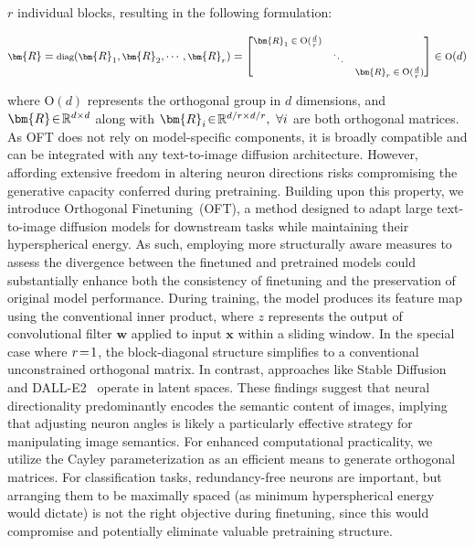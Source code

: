 {$r$ individual blocks, resulting in the following formulation:

\begin{equation}
    \footnotesize
    \bm{R}=\text{diag}(\bm{R}_1,\bm{R}_2,\cdots,\bm{R}_r)=\begin{bmatrix}
    \bm{R}_1\in \text{O}(\frac{d}{r}) &  &\\
    &\ddots & \\
    & & \bm{R}_r\in \text{O}(\frac{d}{r})
    \end{bmatrix}\in \text{O}(d)
\end{equation}

where $\text{O}(d)$ represents the orthogonal group in $d$ dimensions, and $\thickmuskip=2mu \medmuskip=2mu \bm{R} \in \mathbb{R}^{d\times d}$ along with $\thickmuskip=2mu \medmuskip=2mu \bm{R}_i \in \mathbb{R}^{d/r\times d/r},~\forall i$ are both orthogonal matrices. As OFT does not rely on model-specific components, it is broadly compatible and can be integrated with any text-to-image diffusion architecture. However, affording extensive freedom in altering neuron directions risks compromising the generative capacity conferred during pretraining. Building upon this property, we introduce Orthogonal Finetuning~(OFT), a method designed to adapt large text-to-image diffusion models for downstream tasks while maintaining their hyperspherical energy. As such, employing more structurally aware measures to assess the divergence between the finetuned and pretrained models could substantially enhance both the consistency of finetuning and the preservation of original model performance. During training, the model produces its feature map using the conventional inner product, where $z$ represents the output of convolutional filter $\bm{w}$ applied to input $\bm{x}$ within a sliding window. In the special case where $\thickmuskip=2mu \medmuskip=2mu r=1$, the block-diagonal structure simplifies to a conventional unconstrained orthogonal matrix. In contrast, approaches like Stable Diffusion~\cite{rombach2022high} and DALL-E2~\cite{ramesh2022hierarchical} operate in latent spaces. These findings suggest that neural directionality predominantly encodes the semantic content of images, implying that adjusting neuron angles is likely a particularly effective strategy for manipulating image semantics. For enhanced computational practicality, we utilize the Cayley parameterization as an efficient means to generate orthogonal matrices. For classification tasks, redundancy-free neurons are important, but arranging them to be maximally spaced (as minimum hyperspherical energy would dictate) is not the right objective during finetuning, since this would compromise and potentially eliminate valuable pretraining structure. 
}
